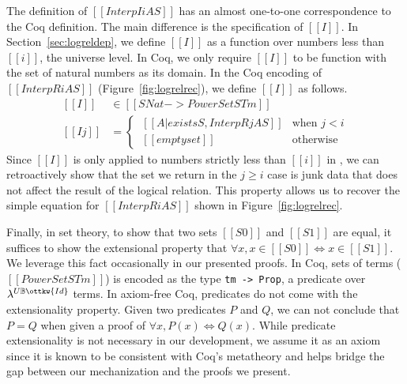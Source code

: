 \documentclass[acmsmall,screen=true,
\ifpublic review=false\else,review=true\fi
  ,anonymous=\ifanonymous true\else false\fi]{acmart}
\newcommand{\lang}{$\lambda^{U\mathbb{B}\ottkw{Id}}$\xspace}
\begin{document}
The definition of $[[Interp I i A S]]$ has an almost one-to-one
correspondence to the Coq definition. The main difference is the
specification of $[[I]]$. In
Section~\ref{sec:logreldep}, we define $[[I]]$ as a function over
numbers less than $[[i]]$, the universe level. In Coq, we only require
$[[I]]$ to be function with the set of natural numbers as its domain.
In the Coq encoding of $[[InterpR i A S]]$ (Figure~\ref{fig:logrelrec}), we define $[[I]]$ as follows.
\begin{equation*}
  \begin{split}
    [[I]]   &\in [[SNat -> PowerSet STm]] \\
    [[I j]] &=
     \begin{cases}
      \ [[{A | exists S , InterpR j A S}]] & \text{when } j < i \\
      \ [[emptyset]] & \text{otherwise}
    \end{cases}
  \end{split}
\end{equation*}
Since $[[I]]$ is only applied to numbers strictly less than $[[i]]$ in
, we can retroactively show that the set we return in the $j
\geq i$ case is junk data that does not affect the result of the logical
relation. This property allows us to recover the simple equation for $[[InterpR i A S]]$ shown in Figure~\ref{fig:logrelrec}.

Finally, in set theory, to show that two sets $[[S0]]$ and $[[S1]]$
are equal, it suffices to show the extensional property that $\forall
x, x \in [[S0]] \iff x \in [[S1]]$. We leverage this fact
occasionally in our presented proofs.
In Coq, sets of terms ($[[PowerSet STm]]$) is encoded as the type \texttt{tm ->
Prop}, a predicate over \lang{} terms.
In axiom-free Coq, predicates do not come with the extensionality
property. Given two predicates $P$ and $Q$, we can not conclude that
$P = Q$ when given a proof of $\forall
x, P(x) \iff Q(x)$. While
predicate extensionality is not necessary in our development, we
assume it as an axiom since it is known to be consistent with Coq's
metatheory and helps bridge the gap between our mechanization and the
proofs we present.


\end{document}
